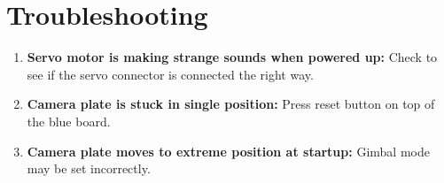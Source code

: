 \documentclass[11pt]{article} %
\begin{document}
\section{Troubleshooting}
\begin{enumerate}
\item \textbf{Servo motor is making strange sounds when powered up:} Check to see if the servo connector is connected the right way.
\item \textbf{Camera plate is stuck in single position:} Press reset button on top of the blue board. 
\item \textbf{Camera plate moves to extreme position at startup:} Gimbal mode may be set incorrectly.
\end{enumerate}
\end{document}
